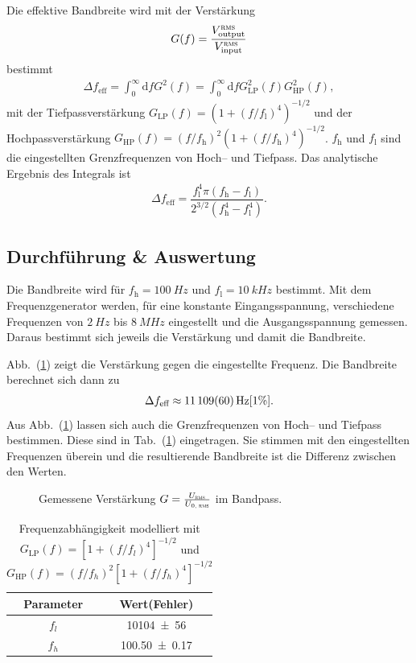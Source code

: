 \documentclass[sn-mathphys-num,iicol]{sn-jnl}
\theoremstyle{thmstyleone}
\theoremstyle{thmstyletwo}
\theoremstyle{thmstylethree}
\newcommand{\td}{\text{d}}
\begin{document}
Die effektive Bandbreite wird mit der Verstärkung
\begin{align}
	G(f)=\dfrac{V^\textsc{rms}_\text{output}}{V^\textsc{rms}_\text{input}}
\end{align}
bestimmt
\begin{align}
	\Delta f_\text{eff}=\int_{0}^{\infty}\td fG^2(f)=\int_{0}^{\infty}\td fG_\text{LP}^2(f)G_\text{HP}^2(f)
	,\end{align}
mit der Tiefpassverstärkung $G_\text{LP}(f)=\left(1+(f/f_\text{l})^4\right)^{-1/2}$ und der Hochpassverstärkung $G_\text{HP}\left(f\right)=\left(f/f_\text{h}\right)^2\left(1+(f/f_\text{h})^4\right)^{-1/2}$.
$f_\text{h}$ und $f_\text{l}$ sind die eingestellten Grenzfrequenzen von Hoch-- und Tiefpass.
Das analytische Ergebnis des Integrals ist
\begin{align}
	\Delta f_\text{eff}=\dfrac{f_\text{l}^4\pi \left(f_\text{h}-f_\text{l}\right)}{2^{3/2}\left(f_\text{h}^4-f_\text{l}^4\right)}
.\end{align}

\subsection{Durchführung \& Auswertung} \label{sec:bandbreite}
Die Bandbreite wird für $f_\text{h}=\SI{100}{Hz}$ und $f_\text{l}=\SI{10}{kHz}$ bestimmt.
Mit dem Frequenzgenerator werden, für eine konstante Eingangsspannung, verschiedene Frequenzen von $\SI{2}{Hz}$ bis $\SI{8}{MHz}$ eingestellt und die Ausgangsspannung gemessen.
Daraus bestimmt sich jeweils die Verstärkung und damit die Bandbreite.

Abb.\ (\ref{fig:bandpass}) zeigt die Verstärkung gegen die eingestellte Frequenz.
Die Bandbreite berechnet sich dann zu
\begin{align}
  \Delta f_\text{eff}\approx \SI{11109+-60}{Hz}[1\%]
.\end{align}
Aus Abb.\ (\ref{fig:bandpass}) lassen sich auch die Grenzfrequenzen von Hoch-- und Tiefpass bestimmen.
Diese sind in Tab.\ (\ref{tab:bandpass_parameter}) eingetragen.
Sie stimmen mit den eingestellten Frequenzen überein und die resultierende Bandbreite ist die Differenz zwischen den Werten.

\begin{figure}[t]
	\centering
	\resizebox{.5\textwidth}{!}{}
	\caption{Gemessene Verstärkung $G=\frac{U_{\textsc{rms}}}{U_{0\textsc{, rms}}}$ im Bandpass.} \label{fig:bandpass}
\end{figure}
\begin{table}[t]
	\begin{tabular}{cc}
    \toprule
		\textbf{Parameter} & {\textbf{Wert(Fehler)}} \\
    \midrule
		$f_l$              & \SI{10104 \pm 56}{}     \\
		$f_h$              & \SI{100.50 \pm 0.17}{}  \\
    \bottomrule
	\end{tabular}
	\label{tab:bandpass_parameter}
	\caption{Frequenzabhängigkeit modelliert mit $G_\text{LP}(f)=\left[1+(f/f_l)^4\right]^{-1/2}$ und $G_\text{HP}(f)=(f/f_h)^2\left[1+(f/f_h)^4\right]^{-1/2}$}
\end{table}
\end{document}

